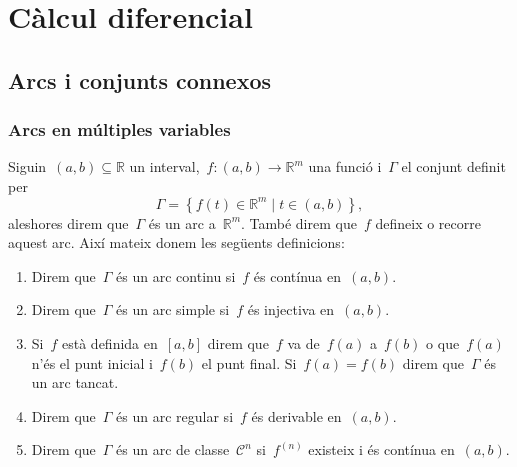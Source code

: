 \documentclass[../calcul-en-diverses-variables.tex]{subfiles}
\begin{document}
\chapter{Càlcul diferencial}
\section{Arcs i conjunts connexos}
    \subsection{Arcs en múltiples variables}
    \begin{definition}
        \label{def:arc}
        \label{def:arc-continu}
        \label{def:arc-simple}
        \label{def:arc-tancat}
        \label{def:arc-regular}
        \label{def:arc-de-classe-de-diferenciabilitat-n}
        Siguin~\((a,b)\subseteq\mathbb{R}\) un interval,~\(f\colon(a,b)\to\mathbb{R}^{m}\) una funció i~\(\Gamma\) el conjunt definit per
        \[
            \Gamma=\left\{f(t)\in\mathbb{R}^{m}\mid t\in(a,b)\right\},
        \]
        aleshores direm que~\(\Gamma\) és un arc a~\(\mathbb{R}^{m}\).
        També direm que~\(f\) defineix o recorre aquest arc.
        Així mateix donem les següents definicions:
        \begin{enumerate}
            \item Direm que~\(\Gamma\) és un arc continu si~\(f\) és contínua en~\((a,b)\).
            \item Direm que~\(\Gamma\) és un arc simple si~\(f\) és injectiva en~\((a,b)\).
            \item Si~\(f\) està definida en~\([a,b]\) direm que~\(f\) va de~\(f(a)\) a~\(f(b)\) o que~\(f(a)\) n'és el punt inicial i~\(f(b)\) el punt final.
            Si~\(f(a)=f(b)\) direm que~\(\Gamma\) és un arc tancat.
            \item Direm que~\(\Gamma\) és un arc regular si~\(f\) és derivable en~\((a,b)\).
            \item Direm que~\(\Gamma\) és un arc de classe~\(\mathcal{C}^{n}\) si~\(f^{(n)}\) existeix i és contínua en~\((a,b)\).
        \end{enumerate}
    \end{definition}
\end{document}
